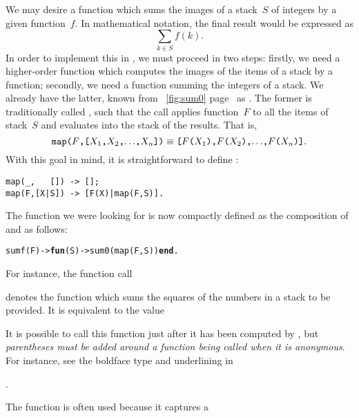 We may desire a function which sums the images of a stack~\(S\) of
integers by a given function~\(f\). In mathematical notation, the
final result would be expressed as
\begin{equation*}
\sum_{k \in S}{f(k)}.
\end{equation*}
In order to implement this in \Erlang, we must proceed in two steps:
firstly, we need a higher\hyp{}order function which computes the
images of the items of a stack by a function; secondly, we need a
function summing the integers of a stack. We already have the latter,
known from \fig~\ref{fig:sum0} page~\pageref{fig:sum0} as
. The former is traditionally called ,
such that the call  applies function~\(F\)
to all the items of stack~\(S\) and evaluates into the stack of the
results. That is,
\begin{equation*}
\texttt{map(\(F\),[\(X_1\),\(X_2\),\(\ldots\),\(X_{n}\)])}
\equiv
\texttt{[\(F\)(\(X_1\)),\(F\)(\(X_2\)),\(\ldots\),\(F\)(\(X_{n}\))]}.
\end{equation*}
With this goal in mind, it is straightforward to define
:
\begin{verbatim}
map(_,   []) -> [];
map(F,[X|S]) -> [F(X)|map(F,S)].
\end{verbatim}
The function we were looking for is now compactly defined as the
composition of  and  as follows:
\begin{alltt}
sumf(F) -> \textbf{fun}(S) -> sum0(map(F,S)) \textbf{end}.
\end{alltt}
For instance, the function call
\begin{center}
\end{center}
denotes the function which sums the squares of the numbers in a stack
to be provided. It is equivalent to the value
\begin{center}
\end{center}
It is possible to call this function just after it has been computed
by , but \emph{parentheses must be added around a
  function being called when it is anonymous}. For instance, see the
boldface type and underlining in
\begin{center}
.
\end{center}
The function  is often used because it captures a
